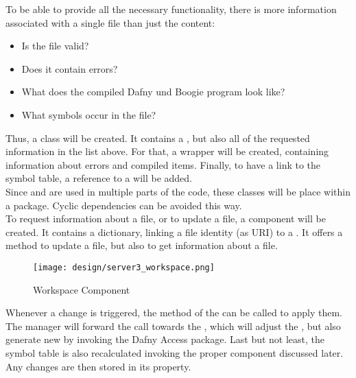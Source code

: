 To be able to provide all the necessary functionality, there is more information associated with a single file than just the content:
\begin{itemize}
    \item Is the file valid?
    \item Does it contain errors?
    \item What does the compiled Dafny und Boogie program look like?
    \item What symbols occur in the file?
\end{itemize}

Thus, a class  will be created.
It contains a , but also all of the requested information in the list above.
For that, a wrapper  will be created, containing information about errors and compiled items.
Finally, to have a link to the symbol table, a reference to a  will be added.\\

Since  and  are used in multiple parts of the code, these classes will be place within a  package.
Cyclic dependencies can be avoided this way.\\

To request information about a file, or to update a file, a component  will be created.
It contains a dictionary, linking a file identity (as URI) to a .
It offers a method to update a file, but also to get information about a file.\\

\begin{figure}[ht]
    \centering
    \texttt{[image: design/server3\_workspace.png]}
    \caption{Workspace Component}
    \label{fig:server_workspace}
\end{figure}

Whenever a change is triggered, the  method of the  can be called to apply them.
The manager will forward the call towards the , which will adjust the ,
but also generate new  by invoking the Dafny Access package.
Last but not least, the symbol table is also recalculated invoking the proper component discussed later.
Any changes are then stored in its  property.\\

